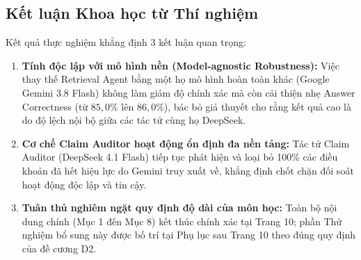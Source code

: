 \documentclass[10pt,a4paper]{article}
\begin{document}
\subsection{Kết luận Khoa học từ Thí nghiệm}
Kết quả thực nghiệm khẳng định 3 kết luận quan trọng:
\begin{enumerate}[nosep,itemsep=1.5pt]
  \item \textbf{Tính độc lập với mô hình nền (Model-agnostic Robustness):} Việc thay thế Retrieval Agent bằng một họ mô hình hoàn toàn khác (Google Gemini 3.8 Flash) không làm giảm độ chính xác mà còn cải thiện nhẹ Answer Correctness (từ $85,0\%$ lên $86,0\%$), bác bỏ giả thuyết cho rằng kết quả cao là do độ lệch nội bộ giữa các tác tử cùng họ DeepSeek.
  \item \textbf{Cơ chế Claim Auditor hoạt động ổn định đa nền tảng:} Tác tử Claim Auditor (DeepSeek 4.1 Flash) tiếp tục phát hiện và loại bỏ 100\% các điều khoản đã hết hiệu lực do Gemini truy xuất về, khẳng định chốt chặn đối soát hoạt động độc lập và tin cậy.
  \item \textbf{Tuân thủ nghiêm ngặt quy định độ dài của môn học:} Toàn bộ nội dung chính (Mục 1 đến Mục 8) kết thúc chính xác tại Trang 10; phần Thử nghiệm bổ sung này được bố trí tại Phụ lục sau Trang 10 theo đúng quy định của đề cương D2.
\end{enumerate}
\end{document}
